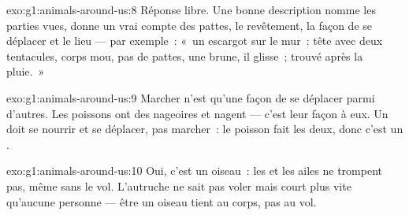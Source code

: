 \begin{solution}{exo:g1:animals-around-us:8}
Réponse libre. Une bonne description nomme les parties vues, donne
un vrai compte des pattes, le revêtement, la façon de se déplacer et
le lieu --- par exemple~: «~un escargot sur le mur~: tête avec deux
tentacules, corps mou, pas de pattes, une  brune, il
glisse~; trouvé après la pluie.~»
\end{solution}

\begin{solution}{exo:g1:animals-around-us:9}
Marcher n'est qu'une façon de se déplacer parmi d'autres. Les
poissons ont des nageoires et nagent --- c'est leur façon à eux. Un
 doit se nourrir et se déplacer, pas marcher~: le poisson fait
les deux, donc c'est un .
\end{solution}

\begin{solution}{exo:g1:animals-around-us:10}
Oui, c'est un oiseau~: les  et les ailes ne trompent pas, même
sans le vol. L'autruche ne sait pas voler mais court plus vite
qu'aucune personne --- être un oiseau tient au corps, pas au vol.
\end{solution}
